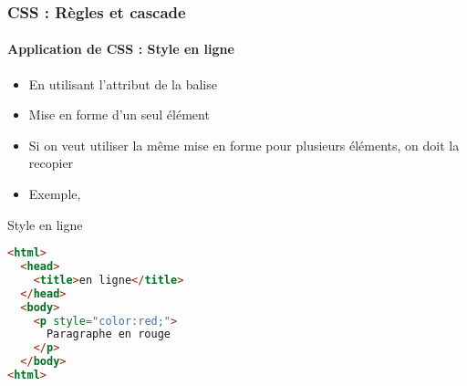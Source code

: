 \documentclass[xcolor=table]{beamer}
\begin{document}
\begin{frame}[fragile]
\frametitle{CSS : Règles et cascade}
\framesubtitle{Application de CSS : Style en ligne}

\begin{minipage}{0.60\textwidth} 
	\begin{itemize}
		\item En utilisant l'attribut  de la balise
		\item Mise en forme d'un seul élément
		\item Si on veut utiliser la même mise en forme pour plusieurs éléments, on doit la recopier
		\item Exemple, 
	\end{itemize}
\end{minipage}
%
\begin{minipage}{0.38\textwidth}
\begin{exampleblock}{Style en ligne}
\lstset{escapeinside=**}
\scriptsize\bfseries
\begin{lstlisting}[language={html}]
<html>
  <head>
    <title>en ligne</title>
  </head>
  <body>
    <p style="color:red;">
      Paragraphe en rouge
    </p>
  </body>
<html>
\end{lstlisting}
\end{exampleblock}
\end{minipage}
\end{frame}
\end{document}
